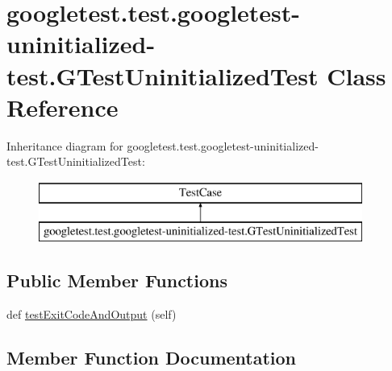 \hypertarget{classgoogletest_1_1test_1_1googletest-uninitialized-test_1_1_g_test_uninitialized_test}{}\section{googletest.\+test.\+googletest-\/uninitialized-\/test.G\+Test\+Uninitialized\+Test Class Reference}
\label{classgoogletest_1_1test_1_1googletest-uninitialized-test_1_1_g_test_uninitialized_test}
Inheritance diagram for googletest.\+test.\+googletest-\/uninitialized-\/test.G\+Test\+Uninitialized\+Test\+:\begin{figure}[H]
\begin{center}
\leavevmode
\includegraphics[height=2.000000cm]{d4/d00/classgoogletest_1_1test_1_1googletest-uninitialized-test_1_1_g_test_uninitialized_test}
\end{center}
\end{figure}
\subsection*{Public Member Functions}
\begin{DoxyCompactItemize}
\item 
def \mbox{\hyperlink{classgoogletest_1_1test_1_1googletest-uninitialized-test_1_1_g_test_uninitialized_test_a6baa9cd421ad66205798f71afdb2e17e}{test\+Exit\+Code\+And\+Output}} (self)
\end{DoxyCompactItemize}


\subsection{Member Function Documentation}
\mbox{\label{classgoogletest_1_1test_1_1googletest-uninitialized-test_1_1_g_test_uninitialized_test_a6baa9cd421ad66205798f71afdb2e17e}} 
